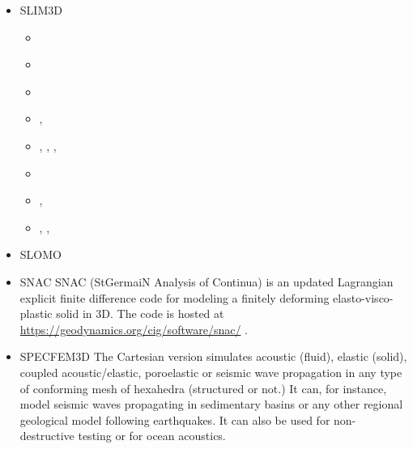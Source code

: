 \begin{itemize}
\item {\codefont SLIM3D} 

\begin{scriptsize}
\begin{itemize}
\item[\twothousandeight]     \textcite{poso08}
\item[\twothousandten]       \textcite{qusp10}
\item[\twothousandtwelve]    \textcite{brps12}
\item[\twothousandthirteen]  \textcite{brps13},  \textcite{brau13}
\item[\twothousandfourteen]  \textcite{brun14},  \textcite{hebr14},  \textcite{kobf14},
                             \textcite{brhp14}
\item[\twothousandfifteen]   \textcite{clbq15}
\item[\twothousandseventeen] \textcite{brcr17},  \textcite{baso17} 
\item[\twothousandeighteen]  \textcite{basq18},  \textcite{osss18},  \textcite{osss18b}
\end{itemize}
\end{scriptsize}

\item {\codefont SLOMO} 

{\small
\noindent
\textcite{kaus05}
\textcite{kasb08}
}

\item {\codefont SNAC} 
SNAC (StGermaiN Analysis of Continua) is an updated Lagrangian explicit finite 
difference code for modeling a finitely deforming elasto-visco-plastic solid in 3D.
The code is hosted at \url{https://geodynamics.org/cig/software/snac/} .

\begin{scriptsize}
\textcite{chlg08}
\textcite{chgu08}
\textcite{qula10}
\textcite{chss11}
\end{scriptsize}


\item {\codefont SPECFEM3D} 
The Cartesian version simulates acoustic (fluid), elastic (solid), coupled acoustic/elastic, 
poroelastic or seismic wave propagation in any type of conforming mesh of hexahedra 
(structured or not.) It can, for instance, model seismic waves propagating in sedimentary 
basins or any other regional geological model following earthquakes. It can also be used 
for non-destructive testing or for ocean acoustics. 


\end{itemize}
